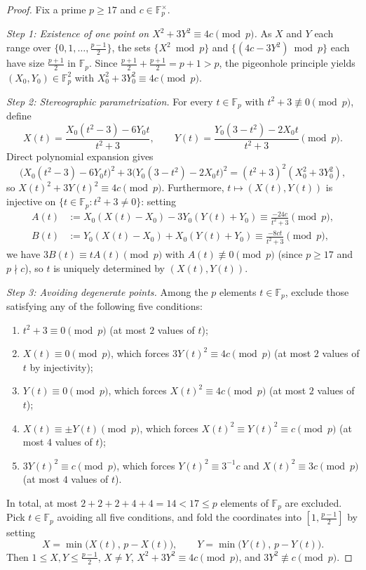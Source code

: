 \documentclass[11pt,reqno]{amsart}
\theoremstyle{remark}
\newcommand{\F}{\mathbb{F}}
\begin{document}
\begin{proof}
Fix a prime $p \ge 17$ and $c \in \F_p^\times$.

\emph{Step 1: Existence of one point on $X^2 + 3Y^2 \equiv 4c \pmod p$.}
As $X$ and $Y$ each range over $\{0, 1, \dots, \frac{p-1}{2}\}$, the sets $\{X^2 \bmod p\}$ and $\{(4c - 3Y^2) \bmod p\}$ each have size $\frac{p+1}{2}$ in $\F_p$. Since $\frac{p+1}{2} + \frac{p+1}{2} = p + 1 > p$, the pigeonhole principle yields $(X_0, Y_0) \in \F_p^2$ with $X_0^2 + 3Y_0^2 \equiv 4c \pmod p$.

\emph{Step 2: Stereographic parametrization.}
For every $t \in \F_p$ with $t^2 + 3 \not\equiv 0 \pmod p$, define
\[
X(t) = \frac{X_0(t^2 - 3) - 6 Y_0 t}{t^2 + 3}, \qquad
Y(t) = \frac{Y_0(3 - t^2) - 2 X_0 t}{t^2 + 3} \pmod p.
\]
Direct polynomial expansion gives
\[
\bigl(X_0(t^2-3) - 6Y_0 t\bigr)^2 + 3\bigl(Y_0(3-t^2) - 2X_0 t\bigr)^2 = (t^2 + 3)^2(X_0^2 + 3Y_0^2),
\]
so $X(t)^2 + 3Y(t)^2 \equiv 4c \pmod p$. Furthermore, $t \mapsto (X(t), Y(t))$ is injective on $\{t \in \F_p : t^2 + 3 \neq 0\}$: setting
\begin{align*}
A(t) &:= X_0(X(t) - X_0) - 3Y_0(Y(t) + Y_0) \equiv \frac{-24c}{t^2 + 3} \pmod p, \\
B(t) &:= Y_0(X(t) - X_0) + X_0(Y(t) + Y_0) \equiv \frac{-8ct}{t^2 + 3} \pmod p,
\end{align*}
we have $3B(t) \equiv t A(t) \pmod p$ with $A(t) \not\equiv 0 \pmod p$ (since $p \ge 17$ and $p \nmid c$), so $t$ is uniquely determined by $(X(t), Y(t))$.

\emph{Step 3: Avoiding degenerate points.}
Among the $p$ elements $t \in \F_p$, exclude those satisfying any of the following five conditions:
\begin{enumerate}
\item $t^2 + 3 \equiv 0 \pmod p$ (at most $2$ values of $t$);
\item $X(t) \equiv 0 \pmod p$, which forces $3Y(t)^2 \equiv 4c \pmod p$ (at most $2$ values of $t$ by injectivity);
\item $Y(t) \equiv 0 \pmod p$, which forces $X(t)^2 \equiv 4c \pmod p$ (at most $2$ values of $t$);
\item $X(t) \equiv \pm Y(t) \pmod p$, which forces $X(t)^2 \equiv Y(t)^2 \equiv c \pmod p$ (at most $4$ values of $t$);
\item $3Y(t)^2 \equiv c \pmod p$, which forces $Y(t)^2 \equiv 3^{-1}c$ and $X(t)^2 \equiv 3c \pmod p$ (at most $4$ values of $t$).
\end{enumerate}
In total, at most $2 + 2 + 2 + 4 + 4 = 14 < 17 \le p$ elements of $\F_p$ are excluded. Pick $t \in \F_p$ avoiding all five conditions, and fold the coordinates into $[1, \frac{p-1}{2}]$ by setting
\[
X = \min\bigl(X(t),\, p - X(t)\bigr), \qquad Y = \min\bigl(Y(t),\, p - Y(t)\bigr).
\]
Then $1 \le X, Y \le \frac{p-1}{2}$, $X \neq Y$, $X^2 + 3Y^2 \equiv 4c \pmod p$, and $3Y^2 \not\equiv c \pmod p$.


\end{proof}
\end{document}
